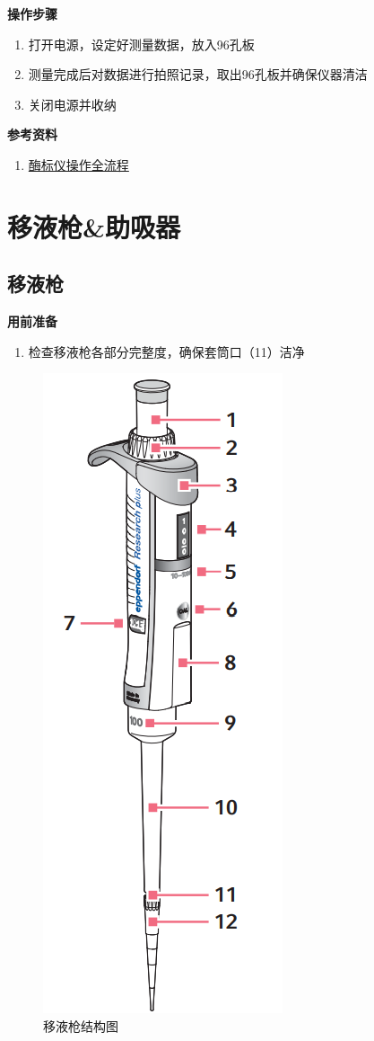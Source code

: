 \documentclass[
]{book}
\providecommand{\tightlist}{%
  \setlength{\itemsep}{0pt}\setlength{\parskip}{0pt}}
\begin{document}
\textbf{操作步骤}

\begin{enumerate}
\def\labelenumi{\arabic{enumi}.}
\tightlist
\item
  打开电源，设定好测量数据，放入96孔板
\item
  测量完成后对数据进行拍照记录，取出96孔板并确保仪器清洁
\item
  关闭电源并收纳
\end{enumerate}

\textbf{参考资料}

\begin{enumerate}
\def\labelenumi{\arabic{enumi}.}
\tightlist
\item
  \href{https://www.bilibili.com/video/BV1i5411A7pp}{酶标仪操作全流程}
\end{enumerate}

\hypertarget{ux79fbux6db2ux67aaux52a9ux5438ux5668}{%
\section{移液枪\&助吸器}\label{ux79fbux6db2ux67aaux52a9ux5438ux5668}}

\hypertarget{ux79fbux6db2ux67aa}{%
\subsection{移液枪}\label{ux79fbux6db2ux67aa}}

\textbf{用前准备}

\begin{enumerate}
\def\labelenumi{\arabic{enumi}.}
\tightlist
\item
  检查移液枪各部分完整度，确保套筒口（11）洁净
\end{enumerate}

\begin{figure}

{\centering \includegraphics[width=0.25\linewidth]{images/Pasted image 20220803010953} 

}

\caption{移液枪结构图}\label{fig:unnamed-chunk-2}
\end{figure}
\end{document}
